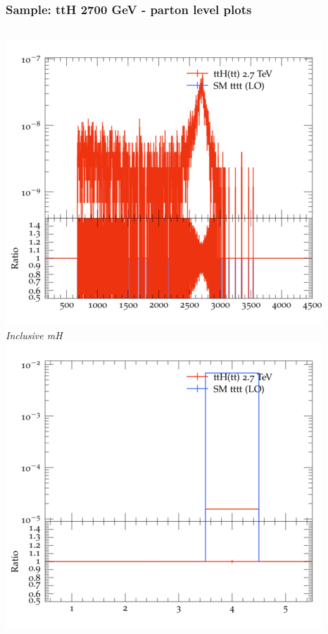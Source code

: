 \documentclass{beamer}
\begin{document}
\begin{frame}
\frametitle{Sample: ttH 2700 GeV - parton level plots}
\begin{columns}
\includegraphics[width=\textwidth]{../plots/ttH_2700/tttt_ttH/Inclusive_mH.png}\\
\textit{\small Inclusive mH}
\includegraphics[width=\textwidth]{../plots/ttH_2700/tttt_ttH/Inclusive_nTop.png}\\

\end{columns}
\end{frame}
\end{document}
